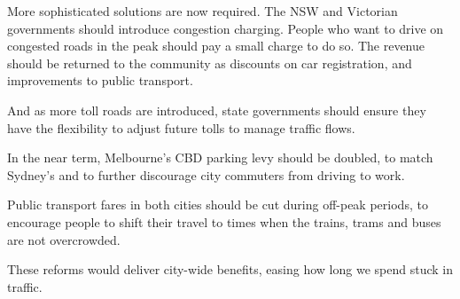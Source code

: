 \documentclass{grattan}
\begin{document}
\begin{overview}
More sophisticated solutions are now required. The NSW and Victorian governments should introduce congestion charging. People who want to drive on congested roads in the peak should pay a small charge to do so. The revenue should be returned to the community as discounts on car registration, and improvements to public transport. 

And as more toll roads are introduced, state governments should ensure they have the flexibility to adjust future tolls to manage traffic flows.

In the near term, Melbourne’s CBD parking levy should be doubled, to match Sydney’s and to further discourage city commuters from driving to work.

Public transport fares in both cities should be cut during off-peak periods, to encourage people to shift their travel to times when the trains, trams and buses are not overcrowded.

These reforms would deliver city-wide benefits, easing how long we spend stuck in traffic. 

\end{overview}
\end{document}
